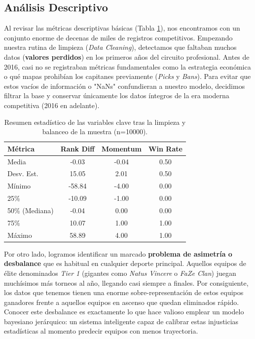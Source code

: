 \documentclass[twocolumn,10pt]{article}
\begin{document}
\subsection{Análisis Descriptivo}
Al revisar las métricas descriptivas básicas (Tabla \ref{tab:resumen_stats}), nos encontramos con un conjunto enorme de decenas de miles de registros competitivos. Empezando nuestra rutina de limpieza (\textit{Data Cleaning}), detectamos que faltaban muchos datos (\textbf{valores perdidos}) en los primeros años del circuito profesional. Antes de 2016, casi no se registraban métricas fundamentales como la estrategia económica o qué mapas prohibían los capitanes previamente (\textit{Picks} y \textit{Bans}). Para evitar que estos vacíos de información o "NaNs" confundieran a nuestro modelo, decidimos filtrar la base y conservar únicamente los datos íntegros de la era moderna competitiva (2016 en adelante).

\begin{table}[H]
\centering
\begin{tabular}{@{}lccc@{}}
\toprule
\textbf{Métrica} & \textbf{Rank Diff} & \textbf{Momentum} & \textbf{Win Rate} \\ \midrule
Media            & -0.03              & -0.04             & 0.50              \\
Desv. Est.       & 15.05              & 2.01              & 0.50              \\
Mínimo           & -58.84             & -4.00             & 0.00              \\
25\%             & -10.09             & -1.00             & 0.00              \\
50\% (Mediana)   & -0.04              & 0.00              & 0.00              \\
75\%             & 10.07              & 1.00              & 1.00              \\
Máximo           & 58.89              & 4.00              & 1.00              \\ \bottomrule
\end{tabular}
\caption{Resumen estadístico de las variables clave tras la limpieza y balanceo de la muestra (n=10000).}
\label{tab:resumen_stats}
\end{table}

Por otro lado, logramos identificar un marcado \textbf{problema de asimetría o desbalance} que es habitual en cualquier deporte principal. Aquellos equipos de élite denominados \textit{Tier 1} (gigantes como \textit{Natus Vincere} o \textit{FaZe Clan}) juegan muchísimos más torneos al año, llegando casi siempre a finales. Por consiguiente, los datos que tenemos tienen una enorme sobre-representación de estos equipos ganadores frente a aquellos equipos en ascenso que quedan eliminados rápido. Conocer este desbalance es exactamente lo que hace valioso emplear un modelo bayesiano jerárquico: un sistema inteligente capaz de calibrar estas injusticias estadísticas al momento predecir equipos con menos trayectoria.
\end{document}
